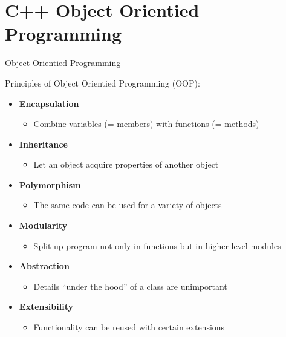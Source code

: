 \documentclass[compress]{beamer}
\begin{document}
%
%
\section{C++ Object Orientied Programming}

 \begin{frame}{Object Orientied Programming}
 \begin{alertblock}{Principles of Object Orientied Programming (OOP):}
 		\begin{itemize}
 			\item \textbf{Encapsulation}
 	    		\begin{itemize}
 	    			\item Combine variables (= members) with functions (= methods)
 	    		\end{itemize}
 	    		
 			\item \textbf{Inheritance}
 		    	\begin{itemize}
 		    		\item Let an object acquire properties of another object
 		    	\end{itemize}
 			\item \textbf{Polymorphism}
 	    		\begin{itemize}
 	    			\item The same code can be used for a variety of objects
 	    		\end{itemize}
 			\item \textbf{Modularity}
 			\begin{itemize}
 				\item Split up program not only in functions but in higher-level modules
 			\end{itemize}
 			\item \textbf{Abstraction}
 			\begin{itemize}
 				\item Details ``under the hood'' of a class are unimportant
 			\end{itemize}
 			\item \textbf{Extensibility}
 			\begin{itemize}
 				\item Functionality can be reused with certain extensions
 			\end{itemize}
 		\end{itemize}
 	\end{alertblock}
 \end{frame}
 
\end{document}
